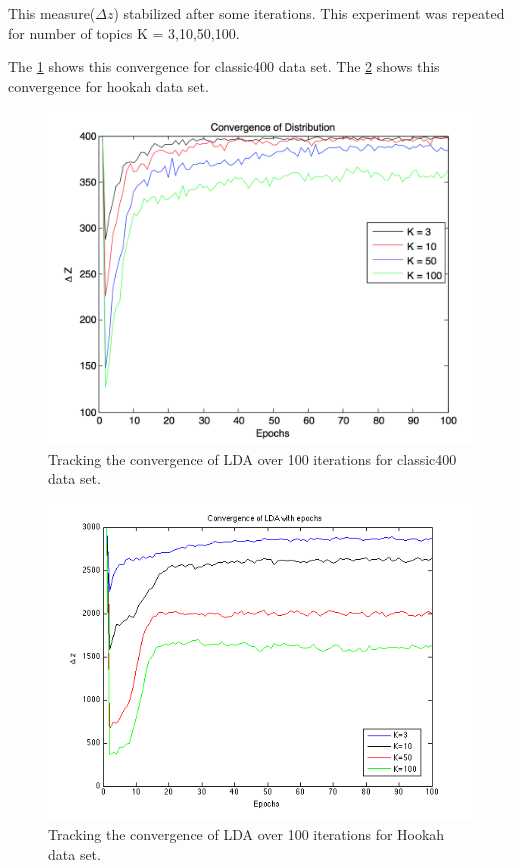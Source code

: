 \documentclass[11pt,a4paper,oneside]{article}
\begin{document}
This measure($\Delta z$) stabilized after some iterations. This experiment was repeated for number of topics K = 3,10,50,100. 

The \ref{fig:classic400_convergence} shows this convergence for classic400 data set. The \ref{fig:hookah_convergence} shows this convergence for hookah data set.

\begin{figure}[H]
\centering
\includegraphics[width=\columnwidth]{classic400_convergence}
\caption{Tracking the convergence of LDA over 100 iterations for classic400 data set.}
\label{fig:classic400_convergence}
\end{figure}

\begin{figure}[H]
\centering
\includegraphics[width=\columnwidth]{hookah_convergence}
\caption{Tracking the convergence of LDA over 100 iterations for Hookah data set.}
\label{fig:hookah_convergence}
\end{figure}
\end{document}
